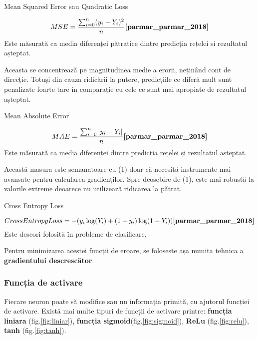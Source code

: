 \documentclass[a4paper, 12pt]{article}
\begin{document}
	\begin{outline}
		\1 Mean Squared Error sau Quadratic Loss 
		
		\begin{equation}
			MSE = \frac{\sum_{i=0}^{n} (y_i - Y_i)^2}{n} \space \textbf{\cite{parmar_parmar_2018}}
		\end{equation}
		\quad Este măsurată ca media diferenței pătratice dintre predicția rețelei si rezultatul așteptat.
		
		\quad Aceasta se concentrează pe magnitudinea medie a erorii, neținând cont de direcție. Totuși din cauza ridicării la putere, predicțiile ce diferă mult sunt penalizate foarte tare în comparație cu cele ce sunt mai apropiate de rezultatul așteptat.   
		
		\1 Mean Absolute Error 
		
		\begin{equation}
			MAE = \frac{\sum_{i=0}^{n} \left|y_i - Y_i\right|}{n} \space \textbf{\cite{parmar_parmar_2018}}
		\end{equation}
		\quad Este măsurată ca media diferenței dintre predicția rețelei și rezultatul așteptat. 
		
		\quad Această masura este semanatoare cu (1) doar că necesită instrumente mai avansate pentru calcularea gradienților. Spre deosebire de (1), este mai robustă la valorile extreme deoarece nu utilizează ridicarea la pătrat.
		
		\1 Cross Entropy Loss 
		
		\begin{equation}
			CrossEntropyLoss = -(y_i\log(Y_i) + (1-y_i)\log(1-Y_i)) \space \textbf{\cite{parmar_parmar_2018}}
		\end{equation}
		Este deseori folosită în probleme de clasificare.
		
	\end{outline}
	
	Pentru minimizarea acestei funcții de eroare, se folosește așa numita tehnica a \textbf{gradientului descrescător}.
	
	\subsubsection{Funcția de activare}
	\quad\space Fiecare neuron poate să modifice sau nu informația primită, cu ajutorul funcției de activare. Există mai multe tipuri de funcții de activare \textbf{\cite{v_v_2017}} printre: \textbf{funcția liniara} (fig.\ref{fig:liniar}), \textbf{funcția sigmoid}(fig.\ref{fig:sigmoid}), \textbf{ReLu} (fig.\ref{fig:relu}), \textbf{tanh} (fig.\ref{fig:tanh}).
	
\end{document}
